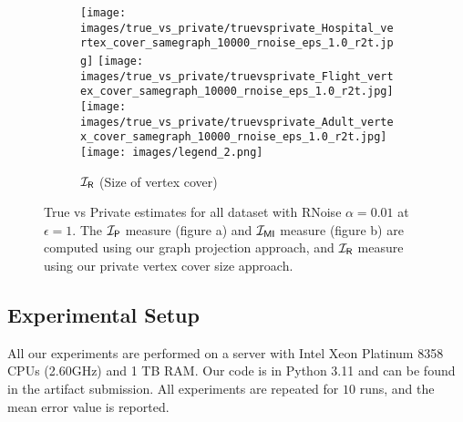 \begin{figure*}
\begin{subfigure}[b]{\textwidth}
         \texttt{[image: images/true\_vs\_private/truevsprivate\_Hospital\_vertex\_cover\_samegraph\_10000\_rnoise\_eps\_1.0\_r2t.jpg]}
         \hfill
         \texttt{[image: images/true\_vs\_private/truevsprivate\_Flight\_vertex\_cover\_samegraph\_10000\_rnoise\_eps\_1.0\_r2t.jpg]}
         \hfill
         \texttt{[image: images/true\_vs\_private/truevsprivate\_Adult\_vertex\_cover\_samegraph\_10000\_rnoise\_eps\_1.0\_r2t.jpg]}
         \texttt{[image: images/legend\_2.png]}
         \caption{$\mathcal{I_\mathsf{R}}$ (Size of vertex cover)}
         \label{fig:tp_rnoise_vcover}
     \end{subfigure}
     \caption{True vs Private estimates for all dataset with RNoise $\alpha = 0.01$ at $\epsilon=1$. The $\mathcal{I_\mathsf{P}}$ measure (figure a) and $\mathcal{I_{\mathsf{MI}}}$ measure (figure b) are computed using our graph projection approach, and $\mathcal{I_\mathsf{R}}$ measure using our private vertex cover size approach. }
     \label{fig:tp_RNoise}
\end{figure*}




\subsection{Experimental Setup}

All our experiments are performed on a server with Intel Xeon Platinum 8358 CPUs (2.60GHz) and 1 TB RAM. Our code is in Python 3.11 and can be found in the artifact submission.
All experiments are repeated for $10$ runs, and the mean error value is reported. 

